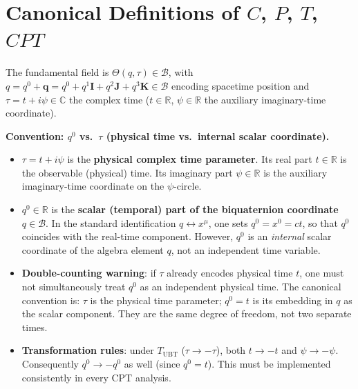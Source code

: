 \documentclass[12pt,a4paper]{article}
\theoremstyle{definition}
\theoremstyle{remark}
\begin{document}
\section{Canonical Definitions of $C$, $P$, $T$, $CPT$}
\label{sec:ds:CPT}

The fundamental field is $\Theta(q,\tau)\in\mathcal{B}$, with
$q = q^0 + \mathbf{q} = q^0 + q^1\mathbf{I}+q^2\mathbf{J}+q^3\mathbf{K}\in\mathcal{B}$
encoding spacetime position and $\tau = t + i\psi\in\mathbb{C}$ the complex
time ($t\in\mathbb{R}$, $\psi\in\mathbb{R}$ the auxiliary imaginary-time
coordinate).

\begin{insightbox}
\textbf{Convention: $q^0$ vs.\ $\tau$ (physical time vs.\ internal scalar coordinate).}
\begin{itemize}
  \item $\tau = t + i\psi$ is the \textbf{physical complex time parameter}.
        Its real part $t\in\mathbb{R}$ is the observable (physical) time.
        Its imaginary part $\psi\in\mathbb{R}$ is the auxiliary imaginary-time
        coordinate on the $\psi$-circle.
  \item $q^0\in\mathbb{R}$ is the \textbf{scalar (temporal) part of the
        biquaternion coordinate} $q\in\mathcal{B}$.  In the standard
        identification $q \leftrightarrow x^\mu$, one sets
        $q^0 = x^0 = ct$, so that $q^0$ coincides with the real-time
        component.  However, $q^0$ is an \emph{internal} scalar coordinate
        of the algebra element $q$, not an independent time variable.
  \item \textbf{Double-counting warning}: if $\tau$ already encodes physical
        time $t$, one must not simultaneously treat $q^0$ as an independent
        physical time.  The canonical convention is: $\tau$ is the physical
        time parameter; $q^0 = t$ is its embedding in $q$ as the scalar
        component.  They are the same degree of freedom, not two separate times.
  \item \textbf{Transformation rules}: under $T_{\mathrm{UBT}}$ ($\tau\to-\tau$),
        both $t\to-t$ and $\psi\to-\psi$.  Consequently $q^0\to-q^0$ as well
        (since $q^0=t$).  This must be implemented consistently in every CPT
        analysis.
\end{itemize}
\end{insightbox}
\end{document}
